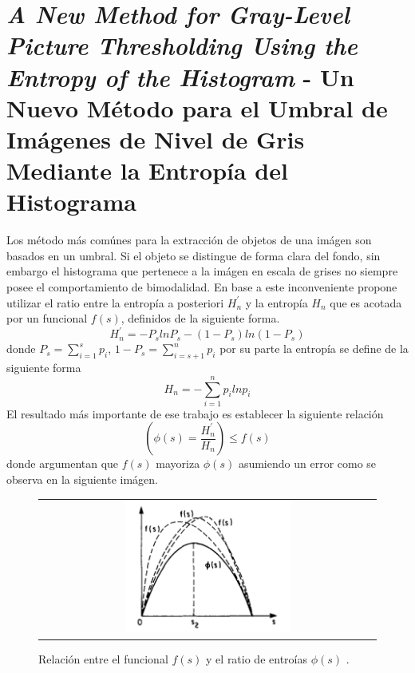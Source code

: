 \documentclass[preprint,12pt]{elsarticle}
\begin{document}
\section{\textit{A New Method for Gray-Level Picture Thresholding Using the Entropy of the Histogram} - Un Nuevo Método para el Umbral de Imágenes de Nivel de Gris Mediante la Entropía del Histograma}

Los método más comúnes para la extracción de objetos de una imágen son basados en un umbral.
%
Si el objeto se distingue de forma clara del fondo, sin embargo el histograma que pertenece a la imágen en escala de grises no siempre posee el comportamiento de bimodalidad.
%
En base a este inconveniente \citet{pun1980new} propone utilizar el ratio entre la entropía a posteriori $H^\prime_n$ y la entropía $H_n$ que es acotada por un funcional $f(s)$, definidos de la siguiente forma.
\begin{equation}
    H^\prime_n = -P_s ln P_s -(1-P_s) ln (1-P_s)
\end{equation}
donde $P_s = \sum_{i=1}^s p_i$, $1-P_s = \sum_{i=s+1}^n p_i$ 
%
por su parte la entropía se define de la siguiente forma
\begin{equation}
    H_n = -\sum_{i=1}^n p_i ln p_i
\end{equation}
%
El resultado más importante de ese trabajo es establecer la siguiente relación
\begin{equation}
    \left (\phi(s) = \frac{H^\prime_n}{H_n} \right ) \leq f(s)
\end{equation}
donde argumentan que $f(s)$ mayoriza $\phi(s)$ asumiendo un error como se observa en la siguiente imágen.
%
\begin{figure}[H]
\centering
\begin{tabular}{c}
   \includegraphics[width=0.5\textwidth]{entropy.png}  
\end{tabular}
\caption{Relación entre el funcional $f(s)$ y el ratio de entroías $\phi(s)$ .}
\end{figure}
\end{document}
